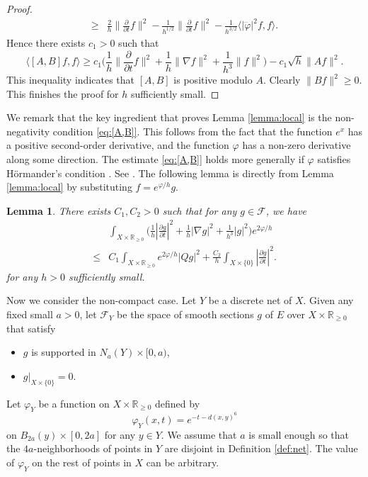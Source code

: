 \documentclass[12pt, reqno]{amsart}
\theoremstyle{plain}%
\newtheorem{lemma}[theorem]{Lemma}
\theoremstyle{definition}
\theoremstyle{remark}
\numberwithin{equation}{section}
\newcommand{\R}{\mathbb{R}}
\begin{document}
\begin{proof}
\begin{align*}
	 	\geq &\frac 2 h\|\frac{\partial}{\partial t}f\|^2 -\frac{1}{h^{1/2}}\|\frac{\partial}{\partial t}f\|^2
	 	-\frac{1}{h^{3/2}}\langle |\dddot\varphi|^2f,f\rangle.
	 \end{align*}
	 Hence there exists $c_1>0$ such that
	 \begin{equation}\label{eq:[A,B]}
	 	\langle[A,B] f,f\rangle\geq c_1\Big(\frac 1 h\|\frac{\partial}{\partial t} f\|^2+\frac 1 h\|\nabla f\|^2+\frac{1}{h^3}\|f\|^2\Big)-c_1\sqrt h\|Af\|^2.
	 \end{equation}
	 This inequality indicates that $[A, B]$ is positive modulo $A$. Clearly $\|Bf\|^2\geq 0$.
	 This finishes the proof for $h$ sufficiently small.
\end{proof}

We remark that the key ingredient that proves Lemma \ref{lemma:local} is the non-negativity condition \eqref{eq:[A,B]}. This follows from the fact that the function $e^x$ has a positive second-order derivative, and the function $\varphi$ has a non-zero derivative along some direction. The estimate \eqref{eq:[A,B]} holds more generally if $\varphi$ satisfies H\"{o}rmander's condition \cite[Theorem 27.1.11]{HormanderIV}. See \cite[Section 3]{MR3041662}. The following lemma is directly from Lemma \ref{lemma:local} by substituting $f=e^{\varphi/h}g$.
\begin{lemma}\label{lemma:local2}
	There exists $C_1, C_2>0$ such that for any $g\in\mathcal F$, we have
	\begin{align*}
		& \int_{X\times\R_{\geq 0}}\Big(\frac 1 h |\frac{\partial g}{\partial t} |^2+\frac 1 h|\nabla g|^2+\frac{1}{h^3}|g|^2\Big)e^{2\varphi/h}\\
		\leq & C_1 \int_{X\times\R_{\geq 0}}e^{2\varphi/h}|Qg|^2+\frac{C_2}{h}\int_{X\times\{0\}}|\frac{\partial g}{\partial t}|^2.
	\end{align*}
		for any $h>0$ sufficiently small.
\end{lemma}

Now we consider the non-compact case. Let $Y$ be a discrete net of $X$.
	Given any fixed small $a>0$, let $\mathcal F_Y$ be the space of smooth sections $g$ of $E$ over $X\times\R_{\geq 0}$ that satisfy
	\begin{itemize}
		\item $g$ is supported in $N_a(Y)\times [0,a)$,
		\item $g|_{X\times \{0\}}=0$.
	\end{itemize}
Let $\varphi_Y$ be a function on $X\times\R_{\geq 0}$ defined by
$$\varphi_Y(x,t)=e^{-t-d(x,y)^6}$$
on $B_{2a}(y)\times[0,2a]$ for any $y\in Y$. We assume that $a$ is small enough  so that the $4a$-neighborhoods of points in $Y$ are disjoint in Definition \ref{def:net}. The value of $\varphi_Y$ on the rest of points in $X$ can be arbitrary.
\end{document}
